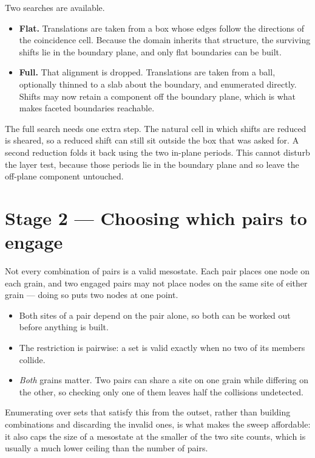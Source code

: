 \documentclass[11pt]{article}
\begin{document}
Two searches are available.

\begin{itemize}
  \item \textbf{Flat.} Translations are taken from a box whose edges follow the
        directions of the coincidence cell. Because the domain inherits that
        structure, the surviving shifts lie in the boundary plane, and only flat
        boundaries can be built.
  \item \textbf{Full.} That alignment is dropped. Translations are taken from a
        ball, optionally thinned to a slab about the boundary, and enumerated
        directly. Shifts may now retain a component off the boundary plane,
        which is what makes faceted boundaries reachable.
\end{itemize}

The full search needs one extra step. The natural cell in which shifts are
reduced is sheared, so a reduced shift can still sit outside the box that was
asked for. A second reduction folds it back using the two in-plane periods.
This cannot disturb the layer test, because those periods lie in the boundary
plane and so leave the off-plane component untouched.

\section*{Stage 2 --- Choosing which pairs to engage}

Not every combination of pairs is a valid mesostate. Each pair places one node
on each grain, and two engaged pairs may not place nodes on the same site of
either grain --- doing so puts two nodes at one point.

\begin{itemize}
  \item Both sites of a pair depend on the pair alone, so both can be worked out
        before anything is built.
  \item The restriction is pairwise: a set is valid exactly when no two of its
        members collide.
  \item \emph{Both} grains matter. Two pairs can share a site on one grain while
        differing on the other, so checking only one of them leaves half the
        collisions undetected.
\end{itemize}

Enumerating over sets that satisfy this from the outset, rather than building
combinations and discarding the invalid ones, is what makes the sweep
affordable: it also caps the size of a mesostate at the smaller of the two site
counts, which is usually a much lower ceiling than the number of pairs.
\end{document}
